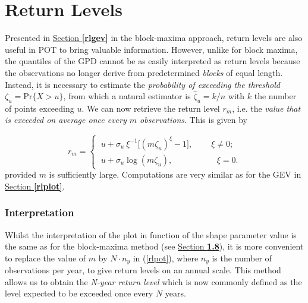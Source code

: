 

\section{Return Levels}\label{sec:rl_gpd}

Presented in \hyperref[rlgev]{Section \textbf{\ref{rlgev}}} in the block-maxima approach, return levels are also useful in POT to bring valuable information. 
However, unlike for block maxima, the quantiles of the GPD cannot be as easily interpreted as return levels because the observations no longer derive from predetermined \emph{blocks} of equal length. Instead, it is necessary to estimate the \emph{probability of exceeding the threshold} $\zeta_u=\text{Pr}\big\{X>u\big\}$, from which a natural estimator is $\hat{\zeta}_u=k/n$ with $k$ the number of points exceeding $u$.
We can now retrieve the return level $r_m$, i.e. the\emph{ value that is exceeded on average once every $m$ observations}. 
This is given by 

\begin{equation}\label{rlpot}
r_m=\begin{cases}
\ u+\sigma_u\ \xi^{-1}\Big[(m\zeta_u)^{\xi}-1\Big], \ \ \ \ \ \ \ \ \  \ \xi\neq 0;\\
\ u +\sigma_u \log(m\zeta_u), \ \quad \ \ \ \ \ \ \  \ \ \ \ \ \ \quad \ \xi =0.
\end{cases}
\end{equation}
provided $m$ is sufficiently large.
Computations are very similar as for the GEV in \hyperref[rlplot]{Section \textbf{\ref{rlplot}}}. 

\subsubsection*{Interpretation}

Whilst the interpretation of the plot in function of the shape parameter value is the same as for the block-maxima method (see \hyperref[rlplot]{Section \textbf{1.8}}), it is more convenient to replace the value of $m$ by $N\cdot n_y$ in (\ref{rlpot}), where $n_y$ is the number of observations per year, to give return levels on an annual scale. This method allows us to obtain the\emph{ N-year return level} which is now commonly defined as the level expected to be exceeded once every $N$ years.

